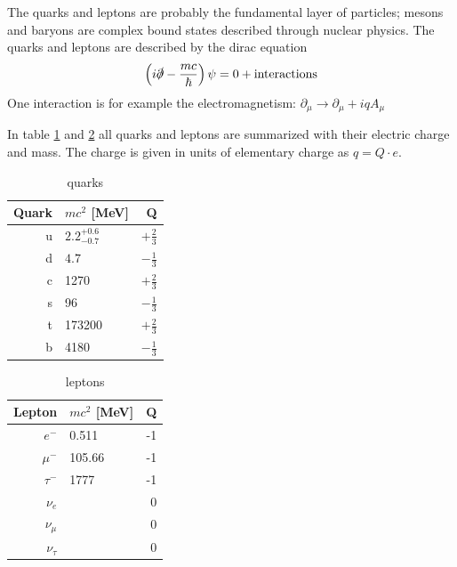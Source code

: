 \documentclass{include/thesisclass}
\newcommand{\cc}{\cdot}
\newcommand{\df}{\rightarrow}
\newcommand{\p}{\partial}
\newcommand{\dslash}{\slashed{\partial}}
\begin{document}
The quarks and leptons are probably the fundamental layer of particles; mesons and baryons are complex bound states described through nuclear physics. The quarks and leptons are described by the dirac equation
\[ \left( i \dslash - \frac{mc}{\hbar} \right)\psi = 0 + \si{interactions}\]
One interaction is for example the electromagnetism: $\p_\mu \df \p_\mu + iq A_\mu$

In table \ref{quarks} and \ref{leptons} all quarks and leptons are summarized with their electric charge and mass. The charge is given in units of elementary charge as $q = Q\cc e$.\\
\begin{minipage}{80mm}
\begin{table}[H]
\centering
\begin{tabular}{r|lr}
Quark & $mc^2$ [MeV] & Q \\
\midrule
u & $2.2^{+0.6}_{-0.7}$ & $+\frac{2}{3}$\\
d & $4.7$ & $-\frac{1}{3}$\\
\midrule
c & 1270 & $+\frac{2}{3}$\\
s & 96 & $-\frac{1}{3}$\\
\midrule
t & 173200 & $+\frac{2}{3}$\\
b & 4180 & $-\frac{1}{3}$\\
\bottomrule
\end{tabular}
\caption{quarks}
\label{quarks}
\end{table}
\end{minipage}
\begin{minipage}{80mm}
\begin{table}[H]
\centering
\begin{tabular}{r|lr}
Lepton & $mc^2$ [MeV] & Q\\
\midrule
$e^-$ & 0.511 & -1\\
$\mu^-$ & 105.66 & -1 \\
$\tau^-$ & 1777 & -1 \\
\midrule
$\nu_e$ & & 0\\
$\nu_\mu$ & & 0\\
$\nu_\tau$ & &0\\
\bottomrule
\end{tabular}
\caption{leptons}
\label{leptons}
\end{table}
\end{minipage}
\end{document}

